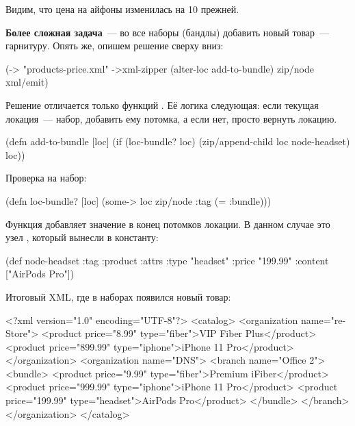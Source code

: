 Видим, что цена на айфоны изменилась на 10%
прежней.

\textbf{Более сложная задача}~--- во все наборы (бандлы) добавить новый товар~---
гарнитуру. Опять же, опишем решение сверху вниз:

\begin{english}
  \begin{clojure}
(-> "products-price.xml"
    ->xml-zipper
    (alter-loc add-to-bundle)
    zip/node
    xml/emit)
  \end{clojure}
\end{english}

Решение отличается только функций . Её логика следующая: если
текущая локация~--- набор, добавить ему потомка, а если нет, просто вернуть
локацию.

\begin{english}
  \begin{clojure}
(defn add-to-bundle [loc]
  (if (loc-bundle? loc)
    (zip/append-child loc node-headset)
    loc))
  \end{clojure}
\end{english}

Проверка на набор:

\begin{english}
  \begin{clojure}
(defn loc-bundle? [loc]
  (some-> loc zip/node :tag (= :bundle)))
  \end{clojure}
\end{english}

Функция  добавляет значение в конец потомков локации. В данном
случае это узел , который вынесли в константу:

\begin{english}
  \begin{clojure}
(def node-headset
  {:tag :product
   :attrs {:type "headset"
           :price "199.99"}
   :content ["AirPods Pro"]})
  \end{clojure}
\end{english}

Итоговый XML, где в наборах появился новый товар:

\begin{english}
  \begin{xml}
<?xml version="1.0" encoding="UTF-8"?>
<catalog>
  <organization name="re-Store">
    <product price="8.99" type="fiber">VIP Fiber Plus</product>
    <product price="899.99" type="iphone">iPhone 11 Pro</product>
  </organization>
  <organization name="DNS">
    <branch name="Office 2">
      <bundle>
        <product price="9.99" type="fiber">Premium iFiber</product>
        <product price="999.99" type="iphone">iPhone 11 Pro</product>
        <product price="199.99" type="headset">AirPods Pro</product>
      </bundle>
    </branch>
  </organization>
</catalog>
  \end{xml}
\end{english}

